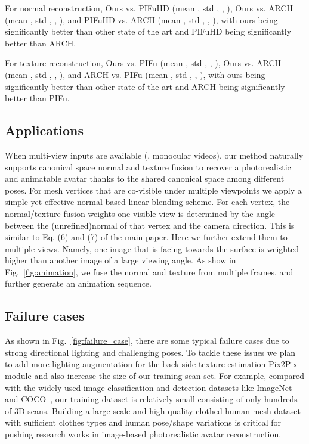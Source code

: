 \documentclass[10pt,twocolumn,letterpaper]{article}
\begin{document}
For normal reconstruction, Ours vs. PIFuHD (mean , std , , ), Ours vs. ARCH (mean , std , , ), and PIFuHD vs. ARCH (mean , std , , ), with ours being significantly better than other state of the art and PIFuHD being significantly better than ARCH.

For texture reconstruction, Ours vs. PIFu (mean , std , , ), Ours vs. ARCH (mean , std , , ), and ARCH vs. PIFu (mean , std , , ), with ours being significantly better than other state of the art and ARCH being significantly better than PIFu. 





\subsection{Applications}

When multi-view inputs are available (\eg, monocular videos), our method naturally supports canonical space normal and texture fusion to recover a photorealistic and animatable avatar thanks to the shared canonical space among different poses. For mesh vertices that are co-visible under multiple viewpoints we apply a simple yet effective normal-based linear blending scheme.
For each vertex, the normal/texture fusion weights \wrt one visible view is determined by the angle between the (unrefined)normal of that vertex and the camera direction. This is similar to Eq. (6) and (7) of the main paper. Here we further extend them to multiple views. Namely, one image that is facing towards the surface is weighted higher than another image of a large viewing angle.
As show in Fig.~\ref{fig:animation}, we fuse the normal and texture from multiple frames, and further generate an animation sequence.

\subsection{Failure cases}

As shown in Fig.~\ref{fig:failure_case}, there are some typical failure cases due to strong directional lighting and challenging poses. To tackle these issues we plan to add more lighting augmentation for the back-side texture estimation Pix2Pix module and also increase the size of our training scan set. For example, compared with the widely used image classification and detection datasets like ImageNet~\cite{deng2009imagenet,russakovsky2015imagenet} and COCO~\cite{lin2014microsoft}, our training dataset is relatively small consisting of only hundreds of 3D scans. Building a large-scale and high-quality clothed human mesh dataset with sufficient clothes types and human pose/shape variations is critical for pushing research works in image-based photorealistic avatar reconstruction.
\end{document}
